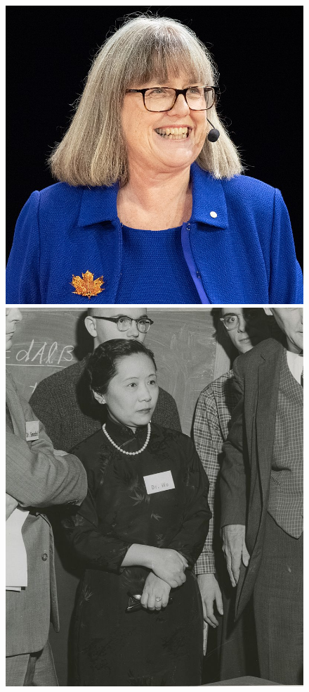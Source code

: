 \documentclass[11pt, brazil]{beamer}
\begin{document}
\begin{frame}
\begin{figure}
 \includegraphics[scale=0.084]{figuras/donna.jpg}
 \includegraphics[scale=0.65]{figuras/chien.jpg}
\end{figure}  
\end{frame}
\end{document}
